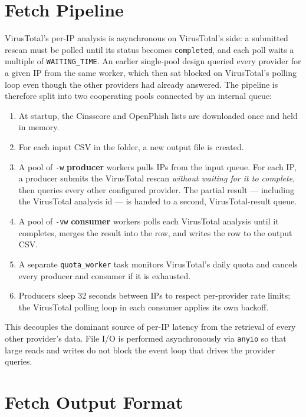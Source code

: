 \section{Fetch Pipeline}

VirusTotal's per-IP analysis is asynchronous on VirusTotal's side: a submitted rescan must be polled
until its status becomes \texttt{completed}, and each poll waits a multiple of
\texttt{WAITING\_TIME}. An earlier single-pool design queried every provider for a given IP from the
same worker, which then sat blocked on VirusTotal's polling loop even though the other providers had
already answered. The pipeline is therefore split into two cooperating pools connected by an
internal queue:

\begin{enumerate}
  \item At startup, the Cinsscore and OpenPhish lists are downloaded once and held in memory.
  \item For each input CSV in the folder, a new output file is created.
  \item A pool of \texttt{-w} \textbf{producer} workers pulls IPs from the input queue. For each IP,
    a producer submits the VirusTotal rescan \emph{without waiting for it to complete}, then queries
    every other configured provider. The partial result --- including the VirusTotal analysis id ---
    is handed to a second, VirusTotal-result queue.
  \item A pool of \texttt{-vw} \textbf{consumer} workers polls each VirusTotal analysis until it
    completes, merges the result into the row, and writes the row to the output CSV.
  \item A separate \texttt{quota\_worker} task monitors VirusTotal's daily quota and cancels every
    producer and consumer if it is exhausted.
  \item Producers sleep 32 seconds between IPs to respect per-provider rate limits; the VirusTotal
    polling loop in each consumer applies its own backoff.
\end{enumerate}

This decouples the dominant source of per-IP latency from the retrieval of every other provider's
data. File I/O is performed asynchronously via \texttt{anyio} so that large reads and writes do not
block the event loop that drives the provider queries.

\section{Fetch Output Format}

